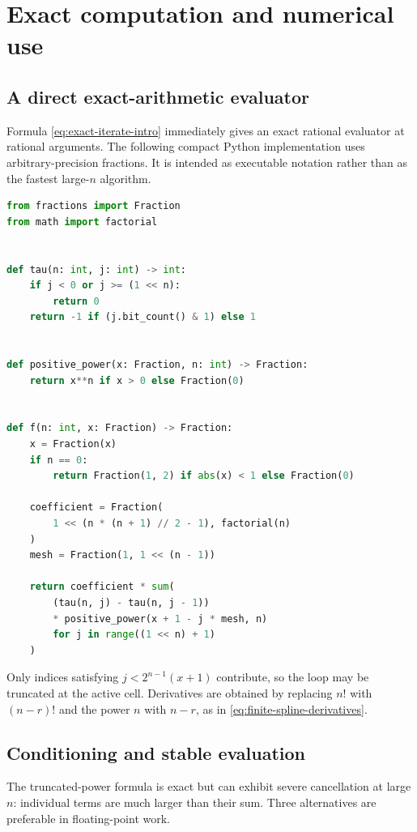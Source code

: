 \documentclass[11pt,oneside]{article}
\theoremstyle{definition}
\theoremstyle{remark}
\begin{document}
\section{Exact computation and numerical use}
\label{sec:computation}

\subsection{A direct exact-arithmetic evaluator}

Formula \eqref{eq:exact-iterate-intro} immediately gives an exact rational evaluator at
rational arguments.  The following compact Python implementation uses arbitrary-precision
fractions.  It is intended as executable notation rather than as the fastest large-$n$
algorithm.

\begin{lstlisting}[style=reportcode,language=Python,caption={Exact evaluation of the finite iterates.},label={lst:exact-evaluator}]
from fractions import Fraction
from math import factorial


def tau(n: int, j: int) -> int:
    if j < 0 or j >= (1 << n):
        return 0
    return -1 if (j.bit_count() & 1) else 1


def positive_power(x: Fraction, n: int) -> Fraction:
    return x**n if x > 0 else Fraction(0)


def f(n: int, x: Fraction) -> Fraction:
    x = Fraction(x)
    if n == 0:
        return Fraction(1, 2) if abs(x) < 1 else Fraction(0)

    coefficient = Fraction(
        1 << (n * (n + 1) // 2 - 1), factorial(n)
    )
    mesh = Fraction(1, 1 << (n - 1))

    return coefficient * sum(
        (tau(n, j) - tau(n, j - 1))
        * positive_power(x + 1 - j * mesh, n)
        for j in range((1 << n) + 1)
    )
\end{lstlisting}

Only indices satisfying $j<2^{n-1}(x+1)$ contribute, so the loop may be truncated at the
active cell.  Derivatives are obtained by replacing $n!$ with $(n-r)!$ and the power $n$
with $n-r$, as in \eqref{eq:finite-spline-derivatives}.

\subsection{Conditioning and stable evaluation}

The truncated-power formula is exact but can exhibit severe cancellation at large $n$:
individual terms are much larger than their sum.  Three alternatives are preferable in
floating-point work.
\end{document}
